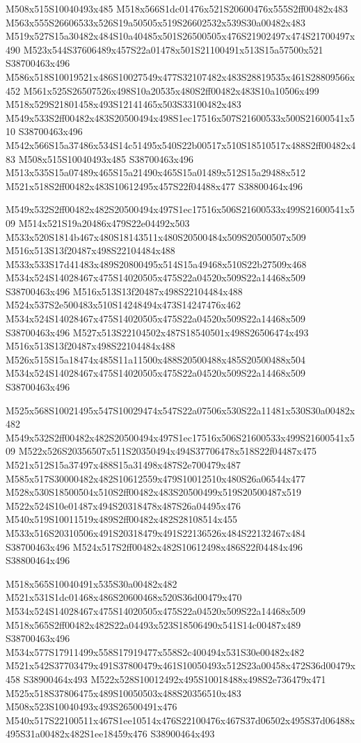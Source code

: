 \documentclass{article}
\begin{document}
\begin{multicols}{2}
M508x515S10040493x485 M518x566S1dc01476x521S20600476x555S2ff00482x483 M563x555S26606533x526S19a50505x519S26602532x539S30a00482x483 M519x527S15a30482x484S10a40485x501S26500505x476S21902497x474S21700497x490 M523x544S37606489x457S22a01478x501S21100491x513S15a57500x521 S38700463x496 M586x518S10019521x486S10027549x477S32107482x483S28819535x461S28809566x452 M561x525S26507526x498S10a20535x480S2ff00482x483S10a10506x499 M518x529S21801458x493S12141465x503S33100482x483 M549x533S2ff00482x483S20500494x498S1ec17516x507S21600533x500S21600541x510 S38700463x496 M542x566S15a37486x534S14c51495x540S22b00517x510S18510517x488S2ff00482x483 M508x515S10040493x485 S38700463x496 M513x535S15a07489x465S15a21490x465S15a01489x512S15a29488x512 M521x518S2ff00482x483S10612495x457S22f04488x477 S38800464x496

M549x532S2ff00482x482S20500494x497S1ec17516x506S21600533x499S21600541x509 M514x521S19a20486x479S22e04492x503 M533x520S1814b467x480S18143511x480S20500484x509S20500507x509 M516x513S13f20487x498S22104484x488 M533x533S17d41483x489S20800495x514S15a49468x510S22b27509x468 M534x524S14028467x475S14020505x475S22a04520x509S22a14468x509 S38700463x496 M516x513S13f20487x498S22104484x488 M524x537S2e500483x510S14248494x473S14247476x462 M534x524S14028467x475S14020505x475S22a04520x509S22a14468x509 S38700463x496 M527x513S22104502x487S18540501x498S26506474x493 M516x513S13f20487x498S22104484x488 M526x515S15a18474x485S11a11500x488S20500488x485S20500488x504 M534x524S14028467x475S14020505x475S22a04520x509S22a14468x509 S38700463x496

M525x568S10021495x547S10029474x547S22a07506x530S22a11481x530S30a00482x482 M549x532S2ff00482x482S20500494x497S1ec17516x506S21600533x499S21600541x509 M522x526S20356507x511S20350494x494S37706478x518S22f04487x475 M521x512S15a37497x488S15a31498x487S2e700479x487 M585x517S30000482x482S10612559x479S10012510x480S26a06544x477 M528x530S18500504x510S2ff00482x483S20500499x519S20500487x519 M522x524S10e01487x494S20318478x487S26a04495x476 M540x519S10011519x489S2ff00482x482S28108514x455 M533x516S20310506x491S20318479x491S22136526x484S22132467x484 S38700463x496 M524x517S2ff00482x482S10612498x486S22f04484x496 S38800464x496

M518x565S10040491x535S30a00482x482 M521x531S1dc01468x486S20600468x520S36d00479x470 M534x524S14028467x475S14020505x475S22a04520x509S22a14468x509 M518x565S2ff00482x482S22a04493x523S18506490x541S14c00487x489 S38700463x496 M534x577S17911499x558S17919477x558S2c400494x531S30e00482x482 M521x542S37703479x491S37800479x461S10050493x512S23a00458x472S36d00479x458 S38900464x493 M522x528S10012492x495S10018488x498S2e736479x471 M525x518S37806475x489S10050503x488S20356510x483 M508x523S10040493x493S26500491x476 M540x517S22100511x467S1ee10514x476S22100476x467S37d06502x495S37d06488x495S31a00482x482S1ee18459x476 S38900464x493


\end{multicols}
\end{document}
